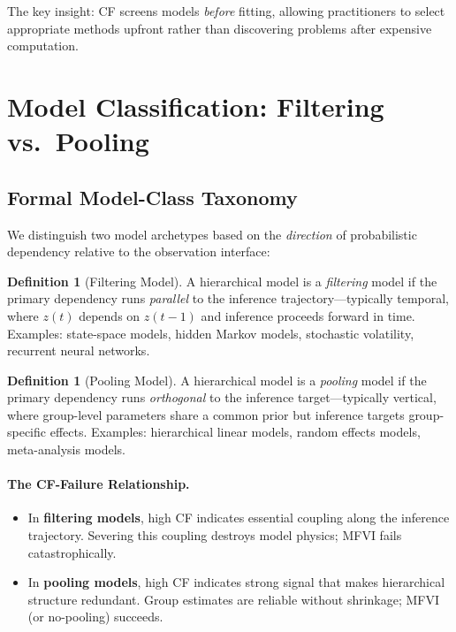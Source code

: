 \documentclass[10pt]{article} %
\theoremstyle{plain}
\theoremstyle{definition}
\newtheorem{definition}[theorem]{Definition}
\begin{document}
\noindent The key insight: CF screens models \emph{before} fitting, allowing practitioners to select appropriate methods upfront rather than discovering problems after expensive computation.

\section{Model Classification: Filtering vs.\ Pooling}
\label{sec:unified}

\subsection{Formal Model-Class Taxonomy}
\label{sec:taxonomy}

We distinguish two model archetypes based on the \emph{direction} of probabilistic dependency relative to the observation interface:

\begin{definition}[Filtering Model]
A hierarchical model is a \emph{filtering} model if the primary dependency runs \emph{parallel} to the inference trajectory---typically temporal, where $z(t)$ depends on $z(t-1)$ and inference proceeds forward in time. Examples: state-space models, hidden Markov models, stochastic volatility, recurrent neural networks.
\end{definition}

\begin{definition}[Pooling Model]
A hierarchical model is a \emph{pooling} model if the primary dependency runs \emph{orthogonal} to the inference target---typically vertical, where group-level parameters share a common prior but inference targets group-specific effects. Examples: hierarchical linear models, random effects models, meta-analysis models.
\end{definition}

\paragraph{The CF-Failure Relationship.}
\begin{itemize}
    \item In \textbf{filtering models}, high CF indicates essential coupling along the inference trajectory. Severing this coupling destroys model physics; MFVI fails catastrophically.
    \item In \textbf{pooling models}, high CF indicates strong signal that makes hierarchical structure redundant. Group estimates are reliable without shrinkage; MFVI (or no-pooling) succeeds.
\end{itemize}
\end{document}
